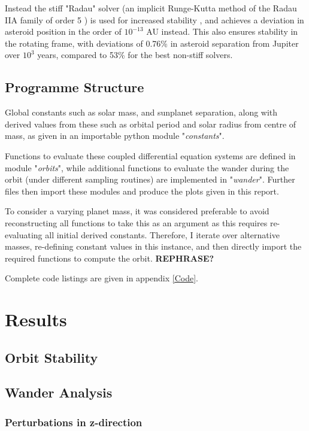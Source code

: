 \documentclass[11pt, a4paper,twocolumn]{article} %
\begin{document}
Instead the stiff "Radau" solver (an implicit Runge-Kutta method of the Radau IIA family of order 5 \cite{Hairer2010}) is used for increased stability \cite{Frank1985}, and achieves a deviation in asteroid position in the order of $ 10^{-13}$ AU instead. This also ensures stability in the rotating frame, with deviations of 0.76\% in asteroid separation from Jupiter over $ 10^{3} $ years, compared to 53\% for the best non-stiff solvers.


\subsection{Programme Structure}
Global constants such as solar mass, and sun\textendash planet separation, along with derived values from these such as orbital period and solar radius from centre of mass, as given in an importable python module "\textit{constants}".

Functions to evaluate these coupled differential equation systems are defined in module "\textit{orbits}", while additional functions to evaluate the wander during the orbit (under different sampling routines) are implemented in "\textit{wander}". Further files then import these modules and produce the plots given in this report.

To consider a varying planet mass, it was considered preferable to avoid reconstructing all functions to take this as an argument as this requires re-evaluating all initial derived constants. Therefore, I iterate over alternative masses, re-defining constant values in this instance, and then directly import the required functions to compute the orbit. \textbf{REPHRASE?}

Complete code listings are given in appendix \ref{Code}.


\section{Results}
\subsection{Orbit Stability}
\subsection{Wander Analysis}
\subsubsection{Perturbations in z-direction}
\end{document}
